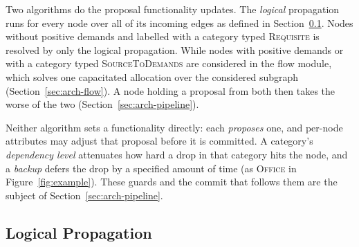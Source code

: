 \documentclass{svproc}
\begin{document}
Two algorithms do the proposal functionality updates. The \emph{logical} propagation runs
for every node over all of its incoming edges as defined in
Section~\ref{sec:arch-logical}. Nodes without positive demands and labelled with a category typed \textsc{Requisite} is resolved by only
the logical propagation. While nodes with positive demands or with a category typed \textsc{SourceToDemands} are considered in the flow module,
which solves one capacitated allocation over the considered subgraph (Section~\ref{sec:arch-flow}). A node holding a proposal from both then
takes the worse of the two (Section~\ref{sec:arch-pipeline}).

Neither algorithm sets a functionality directly: each \emph{proposes} one, and per-node
attributes may adjust that proposal before it is committed. A category's
\emph{dependency level} attenuates how hard a drop in that category hits the node, and
a \emph{backup} defers the drop by a specified amount of time (as \textsc{Office} in
Figure~\ref{fig:example}). These guards and the commit that follows them are the subject
of Section~\ref{sec:arch-pipeline}.



  \subsection{Logical Propagation}\label{sec:arch-logical}
\end{document}
